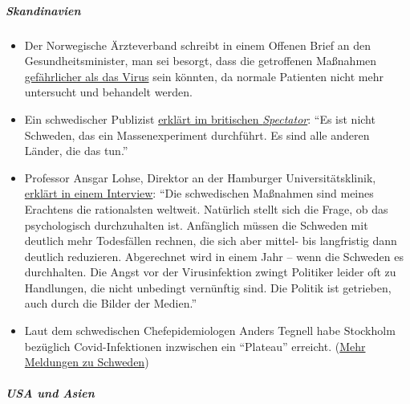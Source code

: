 \hypertarget{skandinavien}{%
\subparagraph{\texorpdfstring{\textbf{Skandinavien}}{Skandinavien}}\label{skandinavien}}

\begin{itemize}
\tightlist
\item
  Der Norwegische Ärzteverband schreibt in einem Offenen Brief an den
  Gesund­heits­minister, man sei besorgt, dass die getroffenen Maßnahmen
  \href{https://www.abcnyheter.no/helse-og-livsstil/helse/2020/04/06/195667780/nesten-halvparten-av-sengene-pa-oslo-universitetssykehus-star-tomme}{gefährlicher
  als das Virus} sein könnten, da normale Patienten nicht mehr
  untersucht und behandelt werden.
\item
  Ein schwedischer Publizist
  \href{https://www.spectator.co.uk/article/no-lockdown-please-w-re-swedish}{erklärt
  im britischen \emph{Spectator}}: ``Es ist nicht Schweden, das ein
  Massenexperiment durchführt. Es sind alle anderen Länder, die das
  tun.''
\item
  Professor Ansgar Lohse, Direktor an der Hamburger Universitätsklinik,
  \href{https://www.abendblatt.de/hamburg/article228880917/uke-professor-shutdown-lohse-deutschland-hamburg-corona-virus-infektion-covid-19-impfstoff-coronavirus-krise-patienten-immunitaet-krankenhaeuser-kontaktverbot-kliniken-infektionsrate.html}{erklärt
  in einem Interview}: ``Die schwedischen Maßnahmen sind meines
  Erachtens die rationalsten weltweit. Natürlich stellt sich die Frage,
  ob das psychologisch durchzuhalten ist. Anfänglich müssen die Schweden
  mit deutlich mehr Todesfällen rechnen, die sich aber mittel- bis
  langfristig dann deutlich reduzieren. Abgerechnet wird in einem Jahr
  -- wenn die Schweden es durchhalten. Die Angst vor der Virusinfektion
  zwingt Politiker leider oft zu Handlungen, die nicht unbedingt
  vernünftig sind. Die Politik ist getrieben, auch durch die Bilder der
  Medien.''
\item
  Laut dem schwedischen Chefepidemiologen Anders Tegnell habe Stockholm
  bezüglich Covid-Infektionen inzwischen ein ``Plateau'' erreicht.
  (\href{https://www.thelocal.se/20200310/timeline-how-the-coronavirus-has-developed-in-sweden}{Mehr
  Meldungen zu Schweden})
\end{itemize}

\hypertarget{usa-und-asien}{%
\subparagraph{\texorpdfstring{\textbf{USA und
Asien}}{USA und Asien}}\label{usa-und-asien}}

